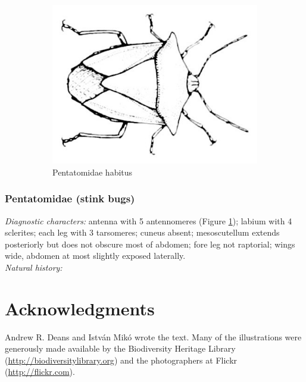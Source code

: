 \documentclass[letterpaper, 11pt]{article}
\begin{document}
\begin{figure}[ht!]
\begin{subfigure}[ht!]{0.4\textwidth}
 \includegraphics[width=\textwidth]{PentatomidHabitus}
 \caption{Pentatomidae habitus \citep[][Plate XXXII, Fig. 2]{bhl82061}}
 \label{fig:pentatomid1}
\end{subfigure}
 \caption{}\label{fig:pentscut}
\end{figure}

\subsubsection{Pentatomidae (stink bugs)}
\noindent{}\textit{Diagnostic characters:} antenna with 5 antennomeres (Figure \ref{fig:pentatomid1}); labium with 4 sclerites; each leg with 3 tarsomeres; cuneus absent; mesoscutellum extends posteriorly but does not obscure most of abdomen; fore leg not raptorial; wings wide, abdomen at most slightly exposed laterally.\\

\noindent{}\textit{Natural history:} \\

\FloatBarrier

\section*{Acknowledgments}
Andrew R. Deans and Istv\'an Mik\'o wrote the text. Many of the illustrations were generously made available by the Biodiversity Heritage Library (\url{http://biodiversitylibrary.org}) and the photographers at Flickr (\url{http://flickr.com}).

\FloatBarrier


\end{document}
